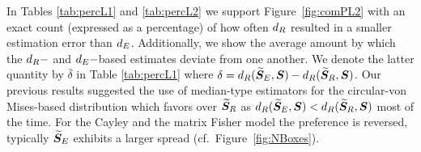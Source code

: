 \noindent In Tables \ref{tab:percL1} and \ref{tab:percL2} we support Figure~\ref{fig:comPL2} with an exact count (expressed as a percentage) of how often ${d_R}$ resulted in a smaller estimation error than ${d_E}$.  Additionally, we show the average amount by which the ${d_R}-$ and ${d_E}-$based estimates deviate from one another.  We denote the latter quantity by $\bar\delta$ in Table \ref{tab:percL1} where  $\delta={d_R}({\widetilde{\bm S}_E},\bm S)-{d_R}({\widetilde{\bm S}_R},\bm S)$.    
Our previous results suggested the use of median-type estimators for the circular-von Mises-based distribution which favors \red{$\ProjMedian$} over ${\widetilde{\bm S}_R}$ as ${d_R}({\widetilde{\bm S}_E},\bm S) < {d_R}({\widetilde{\bm S}_R},\bm S)$ most of the time.  For the Cayley and the matrix Fisher model the preference is reversed, typically  $\ProjMedian$ exhibits a larger spread (cf.~Figure~\ref{fig:NBoxes}). 



